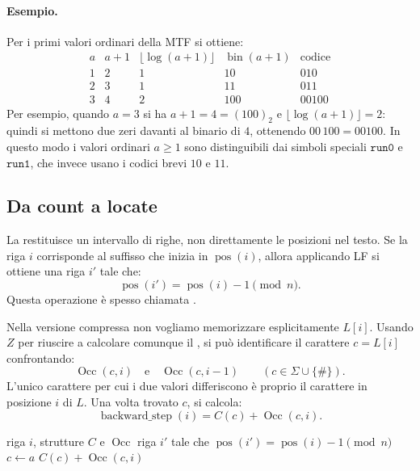 \documentclass{article}
\theoremstyle{definition}
\numberwithin{equation}{section}
\begin{document}
\paragraph{Esempio.}
Per i primi valori ordinari della MTF si ottiene:
\[
    \begin{array}{c|c|c|c|c}
        a & a+1 & \lfloor\log(a+1)\rfloor & \operatorname{bin}(a+1) & \text{codice} \\
        \hline
        1 & 2   & 1                       & 10                      & 010           \\
        2 & 3   & 1                       & 11                      & 011           \\
        3 & 4   & 2                       & 100                     & 00100
    \end{array}
\]
Per esempio, quando $a=3$ si ha $a+1=4=(100)_2$ e $\lfloor\log(a+1)\rfloor=2$: quindi si mettono due zeri davanti al binario di $4$, ottenendo $00\,100=00100$. In questo modo i valori ordinari $a\geq 1$ sono distinguibili dai simboli speciali $\mathtt{run0}$ e $\mathtt{run1}$, che invece usano i codici brevi $10$ e $11$.

\subsection{Da count a locate}
La  restituisce un intervallo di righe, non direttamente le posizioni nel testo. Se la riga $i$ corrisponde al suffisso che inizia in $\operatorname{pos}(i)$, allora applicando LF si ottiene una riga $i'$ tale che:
\[
    \operatorname{pos}(i')
    =
    \operatorname{pos}(i)-1
    \pmod n.
\]
Questa operazione è spesso chiamata \textbf{}.

Nella versione compressa non vogliamo memorizzare esplicitamente $L[i]$. Usando $Z$ per riuscire a calcolare comunque il , si può identificare il carattere $c=L[i]$ confrontando:
\[
    \operatorname{Occ}(c,i)
    \quad\text{e}\quad
    \operatorname{Occ}(c,i-1)
    \qquad
    (c\in\Sigma\cup\{\#\}).
\]
L'unico carattere per cui i due valori differiscono è proprio il carattere in posizione $i$ di $L$. Una volta trovato $c$, si calcola:
\[
    \operatorname{backward\_step}(i)
    =
    C(c)+\operatorname{Occ}(c,i).
\]

\begin{algorithm}[H]
    \caption{Calcolo del }
    \label{alg:fm_backward_step}
    \begin{algorithmic}[1]
        \Require riga $i$, strutture $C$ e $\operatorname{Occ}$
        \Ensure riga $i'$ tale che $\operatorname{pos}(i')=\operatorname{pos}(i)-1 \pmod n$
        \State $c\gets a$
        \EndIf
        \EndFor
        \State \Return $C(c)+\operatorname{Occ}(c,i)$
    \end{algorithmic}
\end{algorithm}
\end{document}
